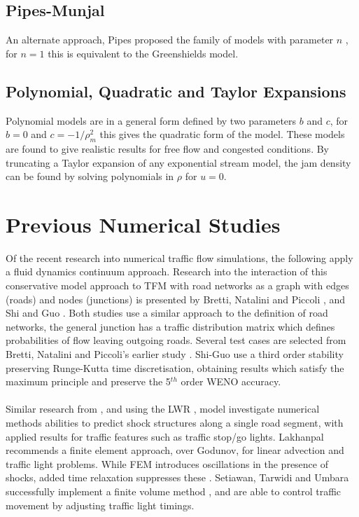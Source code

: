 \subsection*{Pipes-Munjal}

		An alternate approach, Pipes proposed the family of models with parameter $n$ \cite{Pipes67}, for $n=1$ this is equivalent to the Greenshields model. 

\subsection*{Polynomial, Quadratic and Taylor Expansions}

	Polynomial models are in a general form defined by two parameters $b$ and $c$, for $b=0$ and $c=-1/\rho_m^2$ this gives the quadratic form of the model. These models are found to give realistic results for free flow and congested conditions. By truncating a Taylor expansion of any exponential stream model, the jam density can be found by solving polynomials in $\rho$ for $u=0$. 
		
\section{Previous Numerical Studies}

	Of the recent research into numerical traffic flow simulations, the following apply a fluid dynamics continuum approach. Research into the interaction of this conservative  model approach to TFM with road networks as a graph with edges (roads) and nodes (junctions) is presented by Bretti, Natalini and Piccoli \cite{Bretti07}, and Shi and Guo \cite{ShiGuo16}. Both studies use a similar approach to the definition of road networks, the general junction has a traffic distribution matrix which defines probabilities of flow leaving outgoing roads. Several test cases are selected from Bretti, Natalini and Piccoli's earlier study \cite{Bretti06}. Shi-Guo \cite{ShiGuo16} use a third order stability preserving Runge-Kutta time discretisation, obtaining results which satisfy the maximum principle and preserve the 5$^{th}$ order WENO accuracy.
	\\ \\
	Similar research from \cite{Lakhanpal14}, and \cite{Setiawan16} using the LWR \cite{Lighthill55},\cite{Richards56} model investigate numerical methods abilities to predict shock structures along a single road segment, with applied results for traffic features such as traffic stop/go lights. Lakhanpal recommends a finite element approach, over Godunov, for linear advection and traffic light problems. While FEM introduces oscillations in the presence of shocks, added time relaxation suppresses these \cite{Lakhanpal14}. Setiawan, Tarwidi and Umbara successfully implement a finite volume method \cite{Setiawan16}, and are able to control traffic movement by adjusting traffic light timings. 

